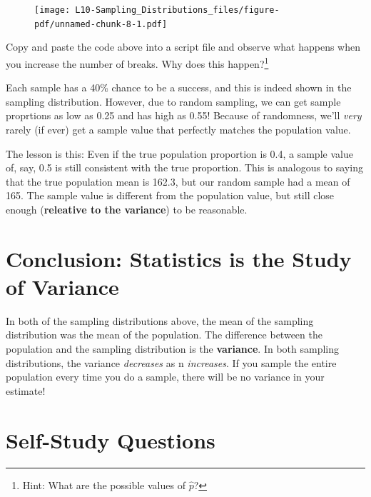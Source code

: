 \documentclass[
  letterpaper,
  DIV=11,
  numbers=noendperiod,
  oneside]{scrreprt}
\begin{document}
\begin{figure}[H]

{\centering \texttt{[image: L10-Sampling\_Distributions\_files/figure-pdf/unnamed-chunk-8-1.pdf]}

}

\end{figure}

Copy and paste the code above into a script file and observe what
happens when you increase the number of breaks. Why does this
happen?\footnote{Hint: What are the possible values of \(\hat p\)?}

Each sample has a 40\% chance to be a success, and this is indeed shown
in the sampling distribution. However, due to random sampling, we can
get sample proprtions as low as 0.25 and has high as 0.55! Because of
randomness, we'll \emph{very} rarely (if ever) get a sample value that
perfectly matches the population value.

The lesson is this: Even if the true population proportion is 0.4, a
sample value of, say, 0.5 is still consistent with the true proportion.
This is analogous to saying that the true population mean is 162.3, but
our random sample had a mean of 165. The sample value is different from
the population value, but still close enough (\textbf{releative to the
variance}) to be reasonable.

\hypertarget{conclusion-statistics-is-the-study-of-variance}{%
\section{Conclusion: Statistics is the Study of
Variance}\label{conclusion-statistics-is-the-study-of-variance}}

In both of the sampling distributions above, the mean of the sampling
distribution was the mean of the population. The difference between the
population and the sampling distribution is the \textbf{variance}. In
both sampling distributions, the variance \emph{decreases} as n
\emph{increases}. If you sample the entire population every time you do
a sample, there will be no variance in your estimate!

\hypertarget{self-study-questions-2}{%
\section{Self-Study Questions}\label{self-study-questions-2}}
\end{document}

